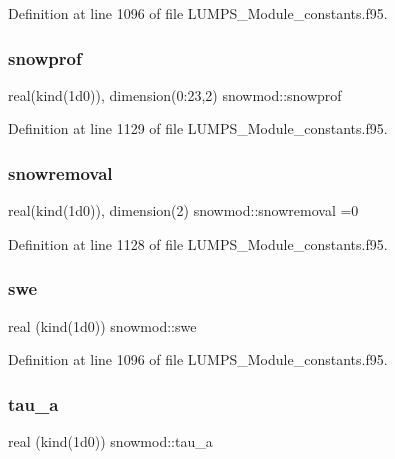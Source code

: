 Definition at line 1096 of file L\+U\+M\+P\+S\+\_\+\+Module\+\_\+constants.\+f95.

\mbox{\label{namespacesnowmod_a1c6363fdf19c43957a62d24fa22ea25e}} 
\subsubsection{\texorpdfstring{snowprof}{snowprof}}
{\footnotesize\ttfamily real(kind(1d0)), dimension(0\+:23,2) snowmod\+::snowprof}



Definition at line 1129 of file L\+U\+M\+P\+S\+\_\+\+Module\+\_\+constants.\+f95.

\mbox{\label{namespacesnowmod_a9c7d574d109596d16542b38123065e66}} 
\subsubsection{\texorpdfstring{snowremoval}{snowremoval}}
{\footnotesize\ttfamily real(kind(1d0)), dimension(2) snowmod\+::snowremoval =0}



Definition at line 1128 of file L\+U\+M\+P\+S\+\_\+\+Module\+\_\+constants.\+f95.

\mbox{\label{namespacesnowmod_a216f7ed83c0474b708443eddfa6c574e}} 
\subsubsection{\texorpdfstring{swe}{swe}}
{\footnotesize\ttfamily real (kind(1d0)) snowmod\+::swe}



Definition at line 1096 of file L\+U\+M\+P\+S\+\_\+\+Module\+\_\+constants.\+f95.

\mbox{\label{namespacesnowmod_a98e11e8fda25e951b1c7a65ec1d36e9f}} 
\subsubsection{\texorpdfstring{tau\+\_\+a}{tau\_a}}
{\footnotesize\ttfamily real (kind(1d0)) snowmod\+::tau\+\_\+a}



